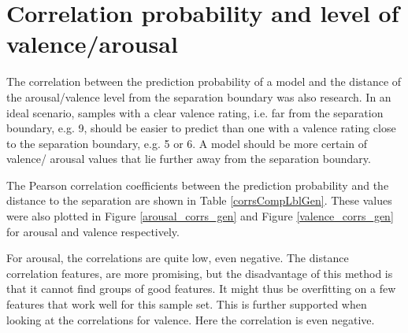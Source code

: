 

\section{Correlation probability and level of valence/arousal}

The correlation between the prediction probability of a model and the distance of the arousal/valence level from the separation boundary was also research. In an ideal scenario, samples with a clear valence rating, i.e. far from the separation boundary, e.g. 9, should be easier to predict than one with a valence rating close to the separation boundary, e.g. 5 or 6. A model should be more certain of valence/ arousal values that lie further away from the separation boundary.

\npar

The Pearson correlation coefficients between the prediction probability and the distance to the separation are shown in Table \ref{corrsCompLblGen}. These values were also plotted in Figure \ref{arousal_corrs_gen} and Figure \ref{valence_corrs_gen} for arousal and valence respectively.

\npar

For arousal, the correlations are quite low, even negative. The distance correlation features, are more promising, but the disadvantage of this method is that it cannot find groups of good features. It might thus be overfitting on a few features that work well for this sample set. This is further supported when looking at the correlations for valence. Here the correlation is even negative.

